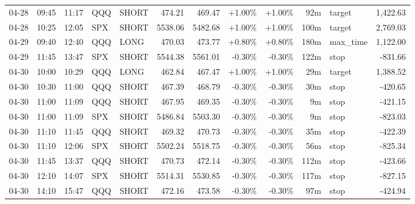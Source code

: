 \documentclass[11pt,a4paper]{article}
\begin{document}
\begin{center}
\begin{longtable}{>{\color{txtmain}}l l l l l r r r r r >{\color{txtmain}}l r}
04-28 & 09:45 & 11:17 & QQQ & SHORT & 474.21 & 469.47 & \textcolor{wingreen}{+1.00\%} & \textcolor{wingreen}{+1.00\%} & 92m & target & \textcolor{wingreen}{1,422.63} \\
04-28 & 10:25 & 12:05 & SPX & SHORT & 5538.06 & 5482.68 & \textcolor{wingreen}{+1.00\%} & \textcolor{wingreen}{+1.00\%} & 100m & target & \textcolor{wingreen}{2,769.03} \\
04-29 & 09:40 & 12:40 & QQQ & LONG & 470.03 & 473.77 & \textcolor{wingreen}{+0.80\%} & \textcolor{wingreen}{+0.80\%} & 180m & max\_time & \textcolor{wingreen}{1,122.00} \\
04-29 & 11:45 & 13:47 & SPX & SHORT & 5544.38 & 5561.01 & \textcolor{lossred}{-0.30\%} & \textcolor{lossred}{-0.30\%} & 122m & stop & \textcolor{lossred}{-831.66} \\
04-30 & 10:00 & 10:29 & QQQ & LONG & 462.84 & 467.47 & \textcolor{wingreen}{+1.00\%} & \textcolor{wingreen}{+1.00\%} & 29m & target & \textcolor{wingreen}{1,388.52} \\
04-30 & 10:30 & 11:00 & QQQ & SHORT & 467.39 & 468.79 & \textcolor{lossred}{-0.30\%} & \textcolor{lossred}{-0.30\%} & 30m & stop & \textcolor{lossred}{-420.65} \\
04-30 & 11:00 & 11:09 & QQQ & SHORT & 467.95 & 469.35 & \textcolor{lossred}{-0.30\%} & \textcolor{lossred}{-0.30\%} & 9m & stop & \textcolor{lossred}{-421.15} \\
04-30 & 11:00 & 11:09 & SPX & SHORT & 5486.84 & 5503.30 & \textcolor{lossred}{-0.30\%} & \textcolor{lossred}{-0.30\%} & 9m & stop & \textcolor{lossred}{-823.03} \\
04-30 & 11:10 & 11:45 & QQQ & SHORT & 469.32 & 470.73 & \textcolor{lossred}{-0.30\%} & \textcolor{lossred}{-0.30\%} & 35m & stop & \textcolor{lossred}{-422.39} \\
04-30 & 11:10 & 12:06 & SPX & SHORT & 5502.24 & 5518.75 & \textcolor{lossred}{-0.30\%} & \textcolor{lossred}{-0.30\%} & 56m & stop & \textcolor{lossred}{-825.34} \\
04-30 & 11:45 & 13:37 & QQQ & SHORT & 470.73 & 472.14 & \textcolor{lossred}{-0.30\%} & \textcolor{lossred}{-0.30\%} & 112m & stop & \textcolor{lossred}{-423.66} \\
04-30 & 12:10 & 14:07 & SPX & SHORT & 5514.31 & 5530.85 & \textcolor{lossred}{-0.30\%} & \textcolor{lossred}{-0.30\%} & 117m & stop & \textcolor{lossred}{-827.15} \\
04-30 & 14:10 & 15:47 & QQQ & SHORT & 472.16 & 473.58 & \textcolor{lossred}{-0.30\%} & \textcolor{lossred}{-0.30\%} & 97m & stop & \textcolor{lossred}{-424.94} \\

\end{longtable}
\end{center}
\end{document}
